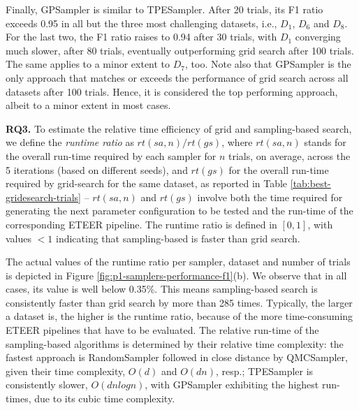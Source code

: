 Finally, GPSampler is similar to TPESampler. After 20 trials, its F1 ratio exceeds 0.95 in all but the three most challenging datasets, i.e., $D_1$, $D_6$ and $D_8$. For the last two, the F1 ratio raises to 0.94 after 30 trials, with $D_1$ converging much slower, after 80 trials, eventually outperforming grid search after 100 trials. The same applies to a minor extent to $D_7$, too. Note also that GPSampler is the only approach that matches or exceeds the performance of grid search across all datasets after 100 trials. Hence, it is considered the top performing approach, albeit to a minor extent in most cases.



\textbf{RQ3.} To estimate the relative time efficiency of grid and sampling-based search, we define the \textit{runtime ratio} as $rt(sa, n)/rt(gs)$, where $rt(sa, n)$ stands for the overall run-time required by each sampler for $n$ trials, on average, across the 5 iterations (based on different seeds), and $rt(gs)$ for the overall run-time required by grid-search for the same dataset, as reported in Table \ref{tab:best-gridesearch-trials} -- $rt(sa, n)$ and $rt(gs)$ involve both the time required for generating the next parameter configuration to be tested and the run-time of the corresponding ETEER pipeline. The runtime ratio is defined in $[0,1]$, with values $<1$ indicating 
that sampling-based is faster than grid search. 

The actual values of the runtime ratio per sampler, dataset and number of trials is depicted in Figure \ref{fig:p1-samplers-performance-f1}(b). We observe that in all cases, its value is well below 0.35\%. This means sampling-based search is consistently faster than grid search by more than 285 times. Typically, the larger a dataset is, the higher is the runtime ratio, because of the more time-consuming ETEER pipelines that have to be evaluated. The relative run-time of the sampling-based algorithms is determined by their relative time complexity: the fastest approach is RandomSampler followed in close distance by QMCSampler, given their time complexity, $O(d)$ and $O(d n)$, resp.; TPESampler is consistently slower, $O(d n logn)$, with GPSampler exhibiting the highest run-times, due to its cubic time complexity.

